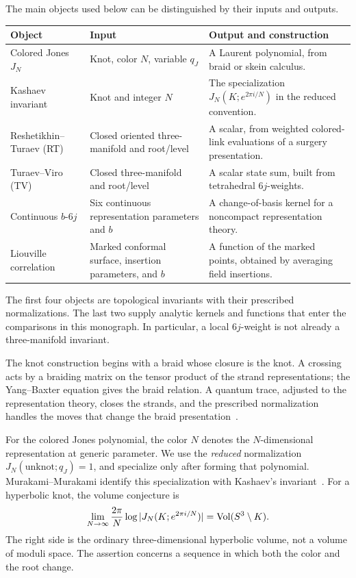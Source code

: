The main objects used below can be distinguished by their inputs and
outputs.
\begin{center}
\small
\begin{tabular}{@{}>{\raggedright\arraybackslash}p{}>{\raggedright\arraybackslash}p{}>{\raggedright\arraybackslash}p{}@{}}
\toprule
Object & Input & Output and construction\\
\midrule
Colored Jones $J_N$ & Knot, color $N$, variable $q_J$
& A Laurent polynomial, from braid or skein calculus.\\[4pt]
Kashaev invariant & Knot and integer $N$
& The specialization $J_N(K;e^{2\pi i/N})$ in the reduced convention.\\[4pt]
Reshetikhin--Turaev (RT) & Closed oriented three-manifold and root/level
& A scalar, from weighted colored-link evaluations of a surgery presentation.\\[4pt]
Turaev--Viro (TV) & Closed three-manifold and root/level
& A scalar state sum, built from tetrahedral $6j$-weights.\\[4pt]
Continuous $b$-$6j$ & Six continuous representation parameters and $b$
& A change-of-basis kernel for a noncompact representation theory.\\[4pt]
Liouville correlation & Marked conformal surface, insertion parameters, and $b$
& A function of the marked points, obtained by averaging field insertions.\\
\bottomrule
\end{tabular}
\end{center}
The first four objects are topological invariants with their prescribed
normalizations. The last two supply analytic kernels and functions
that enter the comparisons in this monograph. In particular, a local
$6j$-weight is not already a three-manifold invariant.

The knot construction begins with a braid whose closure is the knot.
A crossing acts by a braiding matrix on the tensor product of the
strand representations; the Yang--Baxter equation gives the braid
relation. A quantum trace, adjusted to the representation theory,
closes the strands, and the prescribed normalization handles the
moves that change the braid presentation~\cite[Section 2]{MurakamiIntro}.

For the colored Jones polynomial, the color $N$ denotes the
$N$-dimensional representation at generic parameter. We use the
\emph{reduced} normalization $J_N(\text{unknot};q_J)=1$, and specialize
only after forming that polynomial. Murakami--Murakami identify this
specialization with Kashaev's invariant~\cite{MurakamiMurakami}.
For a hyperbolic knot, the volume conjecture is
\begin{equation}
 \lim_{N\to\infty}\frac{2\pi}{N}
 \log|J_N(K;e^{2\pi i/N})|=\operatorname{Vol}(S^3\setminus K).
 \label{eq:introknotvolume}
\end{equation}
The right side is the ordinary three-dimensional hyperbolic volume,
not a volume of moduli space. The assertion concerns a sequence in
which both the color and the root change.

